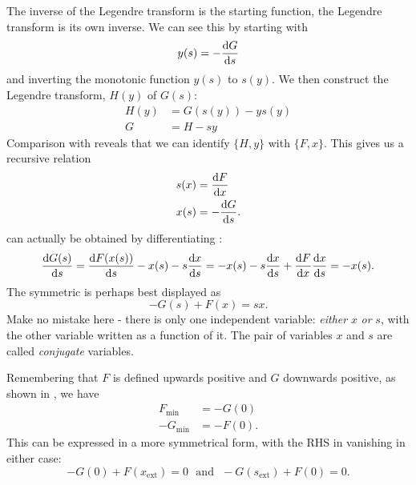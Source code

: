 \begin{prt}[Inverse]
The inverse of the Legendre transform is the starting function, \ie the Legendre transform is its own inverse. We can see this by starting with 
\begin{equation}
y(s)=-\diff Gs
\end{equation}
and inverting the monotonic function $y(s)$ to $s(y)$. 
We then construct the Legendre transform, $H(y)$ of $G(s)$:
\begin{equation}
\begin{aligned}
H(y)&=G(s(y))-ys(y)\\
G&=H-sy
\end{aligned}
\end{equation}
Comparison with  reveals that we can identify $\{H,y\}$ with $\{F,x\}$.
This gives us a recursive relation
\begin{subequations}
\begin{align}
s(x)&=\diff Fx \label{lgd_1}\\
x(s)&=-\diff Gs. \label{lgd_2}
\end{align}
\end{subequations}
 can actually be obtained by differentiating :
\begin{equation}
\diff{G(s)}{s}=\diff{F(x(s))}{s}-x(s)-s\diff xs=-x(s)-s\diff xs+\diff Fx\diff xs=-x(s).
\end{equation}
The symmetric is perhaps best displayed as 
\begin{equation}
\label{lgd_symm}
-G(s)+F(x)=sx.
\end{equation}
Make no mistake here - there is only one independent variable: \textit{either} $x$ \textit{or} $s$, with the other variable written as a function of it. The pair of variables $x$ and $s$ are called \textit{conjugate} variables. 
\end{prt}
\begin{prt}[Extrema]
Remembering that $F$ is defined upwards positive and $G$ downwards positive, as shown in , we have
\begin{subequations}
\begin{align}
F_{\text{min}}&=-G(0)\\
-G_{\text{min}}&=-F(0).
\end{align}
\end{subequations}
This can be expressed in a more symmetrical form, with the RHS in  vanishing in either case: 
\begin{equation}
-G(0)+F(x_{\text{ext}})=0\ \ \ \text{and}\ \ \ -G(s_{\text{ext}})+F(0)=0.
\end{equation}
\end{prt}
